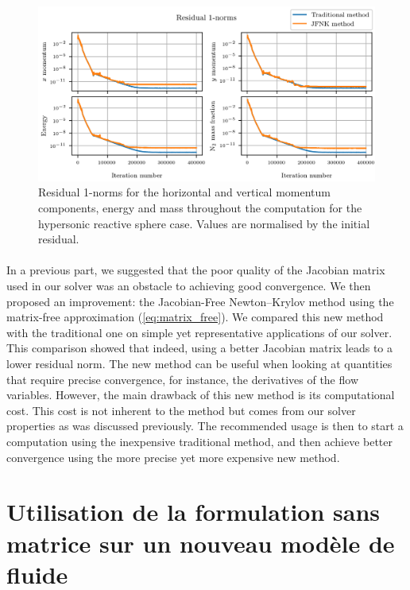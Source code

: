         \begin{figure}
          \includegraphics{figures/sphere_reac_residuals.png}
          \caption{Residual 1-norms for the horizontal and vertical momentum components, energy and  mass throughout the computation for the hypersonic reactive sphere case.
          Values are normalised by the initial residual.}
          \label{fig:sphere_reac_residuals}
        \end{figure}

    \paragraph{}
    In a previous part, we suggested that the poor quality of the Jacobian matrix used in our solver was an obstacle to achieving good convergence.
    We then proposed an improvement: the Jacobian-Free Newton--Krylov method using the matrix-free approximation (\ref{eq:matrix_free}).
    We compared this new method with the traditional one on simple yet representative applications of our solver.
    This comparison showed that indeed, using a better Jacobian matrix leads to a lower residual norm.
    The new method can be useful when looking at quantities that require precise convergence, for instance, the derivatives of the flow variables.
    However, the main drawback of this new method is its computational cost.
    This cost is not inherent to the method but comes from our solver properties as was discussed previously.
    The recommended usage is then to start a computation using the inexpensive traditional method, and then achieve better convergence using the more precise yet more expensive new method.


  \section{Utilisation de la formulation sans matrice sur un nouveau modèle de fluide}


